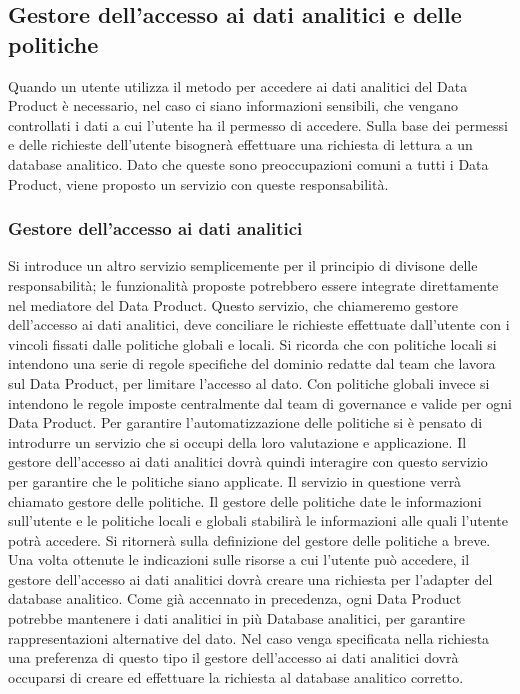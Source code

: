 \documentclass[12pt]{report}
\begin{document}
\subsection{Gestore dell'accesso ai dati analitici e delle politiche}
Quando un utente utilizza il metodo per accedere ai dati analitici del Data Product è necessario, nel caso ci siano informazioni sensibili, che vengano controllati i dati a cui l'utente ha il permesso di accedere.
Sulla base dei permessi e delle richieste dell'utente bisognerà effettuare una richiesta di lettura a un database analitico.
Dato che queste sono preoccupazioni comuni a tutti i Data Product, viene proposto un servizio con queste responsabilità.
\subsubsection{Gestore dell'accesso ai dati analitici}
Si introduce un altro servizio semplicemente per il principio di divisone delle responsabilità; le funzionalità proposte potrebbero essere integrate direttamente nel mediatore del Data Product. 
Questo servizio, che chiameremo gestore dell'accesso ai dati analitici, deve conciliare le richieste effettuate dall'utente con i vincoli fissati dalle politiche globali e locali.
Si ricorda che con politiche locali si intendono una serie di regole specifiche del dominio redatte dal team che lavora sul  Data Product, per limitare l'accesso al dato.
Con politiche globali invece si intendono le regole imposte centralmente dal team di governance e valide per ogni Data Product.
Per garantire l'automatizzazione delle politiche si è pensato di introdurre un servizio che si occupi della loro valutazione e applicazione.
Il gestore dell'accesso ai dati analitici dovrà quindi interagire con questo servizio per garantire che le politiche siano applicate.
Il servizio in questione verrà chiamato gestore delle politiche. 
Il gestore delle politiche date le informazioni sull'utente e le politiche locali e globali stabilirà le informazioni alle quali l'utente potrà accedere. 
Si ritornerà sulla definizione del gestore delle politiche a breve.
Una volta ottenute le indicazioni sulle risorse a cui l'utente può accedere, il gestore dell'accesso ai dati analitici dovrà creare una richiesta per l'adapter del database analitico.
Come già accennato in precedenza, ogni Data Product potrebbe mantenere i dati analitici in più Database analitici, per garantire rappresentazioni alternative del dato.
Nel caso venga specificata nella richiesta una preferenza di questo tipo il gestore dell'accesso ai dati analitici dovrà occuparsi di creare ed effettuare la richiesta al database analitico corretto.
\end{document}
